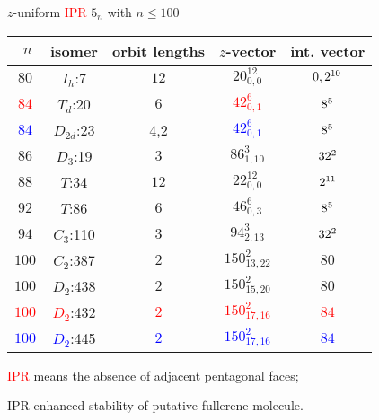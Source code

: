 \documentclass[%
pdf,
colorBG,
slideColor,
]{prosper}
\begin{document}
\begin{slide}{$z$-uniform \textcolor{red}{IPR} $5_n$ with $n\leq 100$}

\begin{center}
{\tiny
\begin{tabular}{|c||c|c|c|c|}
\hline
$\,\,n$&isomer    &orbit lengths& $z$-vector    &  int. vector\\
\hline
$80$&$I_h$:7    &$12$   &$20_{0,0}^{12}$ &$0,2\sp{10}$\\
\textcolor{red}{$84$}&$T_d$:20   &$6$    &\textcolor{red}{$42_{0,1}^{6}$}  &\textcolor{red}{$8\sp{5}$}\\
\textcolor{blue}{$84$}&$D_{2d}$:23&$4$,$2$&\textcolor{blue}{$42_{0,1}^{6}$}  &\textcolor{blue}{$8\sp{5}$}\\
$86$&$D_3$:19   &$3$    &$86_{1,10}^{3}$ &$32\sp{2}$\\
$88$&$T$:34     &$12$   &$22_{0,0}^{12}$ &$2\sp{11}$\\
$92$&$T$:86     &$6$    &$46_{0,3}^6$    &$8\sp{5}$\\
$94$&$C_3$:110  &$3$    &$94_{2,13}^3$   &$32\sp{2}$\\
$100$&$C_2$:387 &$2$    &$150_{13,22}^2$ &$80$\\
$100$&$D_2$:438 &$2$    &$150_{15,20}^2$ &$80$\\
\textcolor{red}{$100$}&\textcolor{red}{$D_2$}:432 &\textcolor{red}{$2$}    &\textcolor{red}{$150_{17,16}^2$} &\textcolor{red}{$84$}\\
\textcolor{blue}{$100$}&\textcolor{blue}{$D_2$}:445 &\textcolor{blue}{$2$}    &\textcolor{blue}{$150_{17,16}^2$} &\textcolor{blue}{$84$}\\
\hline
\end{tabular}
}
\end{center}
\textcolor{red}{IPR} means the absence of adjacent pentagonal faces;

IPR enhanced stability of putative fullerene molecule.


\end{slide}
\end{document}
